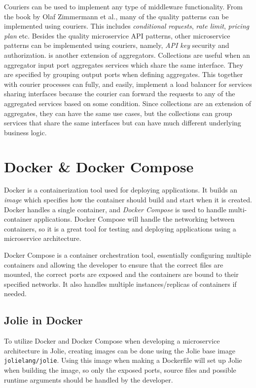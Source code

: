 Couriers can be used to implement any type of middleware functionality. From the book by Olaf Zimmermann et al., many of the quality patterns can be implemented using couriers. This includes
\textit{conditional requests}, \textit{rate limit}, \textit{pricing plan} etc. Besides the quality microservice API patterns, other microservice patterns can be implemented using couriers, namely, \textit{API key} security and authorization.
 is another extension of aggregators. Collections are useful when an aggregator input port aggregates services which share the same interface.
They are specified by grouping output ports when defining aggregates.
This together with courier processes can fully, and easily, implement a load balancer for services sharing interfaces because the courier can forward the requests to any of the aggregated services based on some condition.
Since collections are an extension of aggregates, they can have the same use cases, but the collections can group services that share the same interfaces but can have much different underlying business logic.

\section{Docker \& Docker Compose}
Docker is a containerization tool used for deploying applications. It builds an \textit{image} which specifies how the container should build and start when it is created.
Docker handles a single container, and \textit{Docker Compose} is used to handle multi-container applications. Docker Compose will handle the networking between containers, so it is a great tool for testing and deploying applications using a microservice architecture.

Docker Compose is a container orchestration tool, essentially configuring multiple containers and allowing the developer to ensure that the correct files are mounted, the correct ports are exposed and the containers are bound to their specified networks. It also handles multiple instances/replicas
of containers if needed.

\subsection{Jolie in Docker}
\label{label:jolie_in_docker}
To utilize Docker and Docker Compose when developing a microservice architecture in Jolie, creating images can be done using the Jolie base image \texttt{jolielang/jolie}.
Using this image when making a Dockerfile will set up Jolie when building the image, so only the exposed ports, source files and possible runtime arguments should be handled by the developer.

